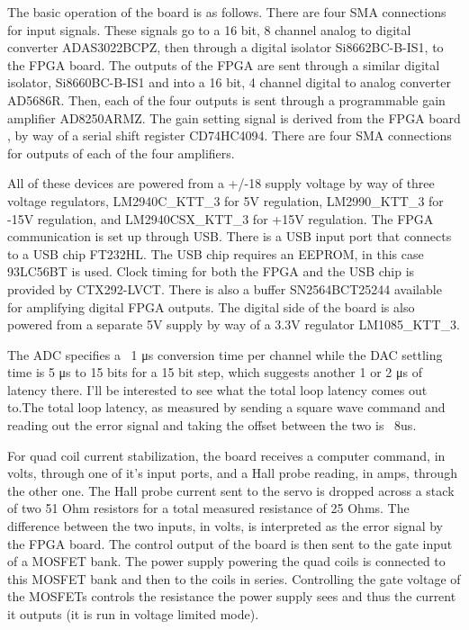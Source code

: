 The basic operation of the board is as follows. There are four SMA connections for input signals. These signals go to a 16 bit, 8 channel analog to digital converter ADAS3022BCPZ, then through a digital isolator Si8662BC-B-IS1, to the FPGA board. The outputs of the FPGA are sent through a similar digital isolator, Si8660BC-B-IS1 and into a 16 bit, 4 channel digital to analog converter AD5686R. Then, each of the four outputs is sent through a programmable gain amplifier AD8250ARMZ. The gain setting signal is derived from the FPGA board , by way of a serial shift register  CD74HC4094. There are four SMA connections for outputs of each of the four amplifiers.  

All of these devices are powered from a +/-18 supply voltage by way of three voltage regulators, LM2940C\_KTT\_3 for 5V regulation, LM2990\_KTT\_3 for -15V regulation, and LM2940CSX\_KTT\_3 for +15V regulation. The FPGA communication is set up through USB. There is a USB input port that connects to a USB chip FT232HL. The USB chip requires an EEPROM, in this case 93LC56BT is used.    Clock timing for both the FPGA and the USB chip is provided by  CTX292-LVCT. There is also a buffer SN2564BCT25244 available for amplifying digital FPGA outputs. The digital side of the board is also powered from a separate 5V supply by way of a 3.3V regulator LM1085\_KTT\_3. 

The ADC specifies a ~1 μs conversion time per channel while the DAC settling time is 5 μs to 15 bits for a 15 bit step, which suggests another 1 or 2 μs of latency there. I’ll be interested to see what the total loop latency comes out to.The total loop latency, as measured by sending a square wave command and reading out the error signal and taking the offset between the two is ~8us. 

For quad coil current stabilization, the board receives a computer command, in volts, through one of it's input ports, and a Hall probe reading, in amps, through the other one.  The Hall probe current sent to the servo is dropped across a stack of two 51 Ohm resistors for a total measured resistance of 25 Ohms. The difference between the two inputs, in volts, is interpreted as the error signal by the FPGA board. The control output of the board is then sent to the gate input of a MOSFET bank. The power supply powering the quad coils is connected to this MOSFET bank and then to the coils in series. Controlling the gate voltage of the MOSFETs controls the resistance the power supply sees and thus the current it outputs (it is run in voltage limited mode).  

